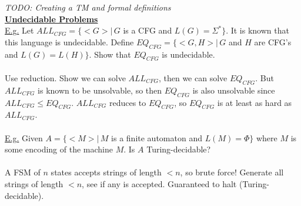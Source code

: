 \documentclass[8pt,letterpaper,twocolumn]{article}
\begin{document}
\emph{TODO: Creating a TM and formal definitions}
\\
\underline{\textbf{Undecidable Problems}} \\
\underline{E.g.} Let $ALL_{CFG} = \{<G> |\, G$ is a CFG and $L(G) = \Sigma^*\}$.
It is known that this language is undecidable.
Define $EQ_{CFG} = \{<G,H> |\, G$ and $H$ are CFG's and $L(G) = L(H)\}$.
Show that $EQ_{CFG}$ is undecidable. \\
\\
Use reduction. Show we can solve $ALL_{CFG}$, then we can solve $EQ_{CFG}$.
But $ALL_{CFG}$ is known to be unsolvable, so then $EQ_{CFG}$ is also unsolvable since
$ALL_{CFG} \leq EQ_{CFG}$. $ALL_{CFG}$ reduces to $EQ_{CFG}$, so $EQ_{CFG}$ is at least as hard
as $ALL_{CFG}$. \\
\\
\underline{E.g.} Given $A = \{<M> |\, M$ is a finite automaton and $L(M) = \Phi\}$
where $M$ is some encoding of the machine $M$. Is $A$ Turing-decidable? \\
\\
A FSM of $n$ states accepts strings of length $< n$, so brute force!
Generate all strings of length $< n$, see if any is accepted. Guaranteed to halt (Turing-decidable).\\
\end{document}
